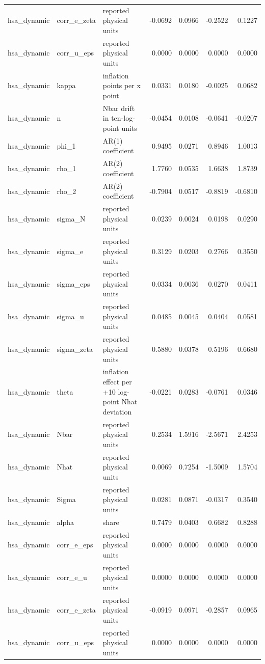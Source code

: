 \begin{tabular}{lllrrrr}
hsa\_dynamic & corr\_e\_zeta & reported physical units & -0.0692 & 0.0966 & -0.2522 & 0.1227 \\
hsa\_dynamic & corr\_u\_eps & reported physical units & 0.0000 & 0.0000 & 0.0000 & 0.0000 \\
hsa\_dynamic & kappa & inflation points per x point & 0.0331 & 0.0180 & -0.0025 & 0.0682 \\
hsa\_dynamic & n & Nbar drift in ten-log-point units & -0.0454 & 0.0108 & -0.0641 & -0.0207 \\
hsa\_dynamic & phi\_1 & AR(1) coefficient & 0.9495 & 0.0271 & 0.8946 & 1.0013 \\
hsa\_dynamic & rho\_1 & AR(2) coefficient & 1.7760 & 0.0535 & 1.6638 & 1.8739 \\
hsa\_dynamic & rho\_2 & AR(2) coefficient & -0.7904 & 0.0517 & -0.8819 & -0.6810 \\
hsa\_dynamic & sigma\_N & reported physical units & 0.0239 & 0.0024 & 0.0198 & 0.0290 \\
hsa\_dynamic & sigma\_e & reported physical units & 0.3129 & 0.0203 & 0.2766 & 0.3550 \\
hsa\_dynamic & sigma\_eps & reported physical units & 0.0334 & 0.0036 & 0.0270 & 0.0411 \\
hsa\_dynamic & sigma\_u & reported physical units & 0.0485 & 0.0045 & 0.0404 & 0.0581 \\
hsa\_dynamic & sigma\_zeta & reported physical units & 0.5880 & 0.0378 & 0.5196 & 0.6680 \\
hsa\_dynamic & theta & inflation effect per +10 log-point Nhat deviation & -0.0221 & 0.0283 & -0.0761 & 0.0346 \\
hsa\_dynamic & Nbar & reported physical units & 0.2534 & 1.5916 & -2.5671 & 2.4253 \\
hsa\_dynamic & Nhat & reported physical units & 0.0069 & 0.7254 & -1.5009 & 1.5704 \\
hsa\_dynamic & Sigma & reported physical units & 0.0281 & 0.0871 & -0.0317 & 0.3540 \\
hsa\_dynamic & alpha & share & 0.7479 & 0.0403 & 0.6682 & 0.8288 \\
hsa\_dynamic & corr\_e\_eps & reported physical units & 0.0000 & 0.0000 & 0.0000 & 0.0000 \\
hsa\_dynamic & corr\_e\_u & reported physical units & 0.0000 & 0.0000 & 0.0000 & 0.0000 \\
hsa\_dynamic & corr\_e\_zeta & reported physical units & -0.0919 & 0.0971 & -0.2857 & 0.0965 \\
hsa\_dynamic & corr\_u\_eps & reported physical units & 0.0000 & 0.0000 & 0.0000 & 0.0000 \\

\end{tabular}

